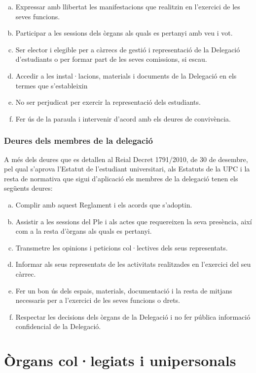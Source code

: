 \documentclass[a4paper,12pt]{article}
\begin{document}
\begin{enumerate}[a)]
	\item Expressar amb llibertat les manifestacions que realitzin en l'exercici de les seves funcions.
	\item Participar a les sessions dels òrgans als quals es pertanyi amb veu i vot.
	\item Ser elector i elegible per a càrrecs de gestió i representació de la Delegació d'estudiants o per formar part de les seves comissions, si escau.
	\item Accedir a les instal·lacions, materials i documents de la Delegació en els termes que s'estableixin
	\item No ser perjudicat per exercir la representació dels estudiants.
	\item Fer ús de la paraula i intervenir d'acord amb els deures de convivència.
\end{enumerate}

\subsubsection{Deures dels membres de la delegació}
A més dels deures que es detallen al Reial Decret 1791/2010, de 30 de desembre, pel qual s'aprova l'Estatut de l'estudiant universitari, als Estatuts de la UPC i la resta de normativa que sigui d'aplicació els membres de la delegació tenen els següents deures:

\begin{enumerate}[a)]
	\item Complir amb aquest Reglament i els acords que s'adoptin.
	\item Assistir a les sessions del Ple i als actes que requereixen la seva presència, així com a la resta d'òrgans als quals es pertanyi.
	\item Transmetre les opinions i peticions col·lectives dels seus representats.
	\item Informar als seus representats de les activitats realitzades en l'exercici del seu càrrec.
	\item Fer un bon ús dels espais, materials, documentació i la resta de mitjans necessaris per a l'exercici de les seves funcions o drets.
	\item Respectar les decisions dels òrgans de la Delegació i no fer pública informació confidencial de la Delegació.
\end{enumerate}
\newpage

\section{Òrgans col·legiats i unipersonals}
\end{document}
